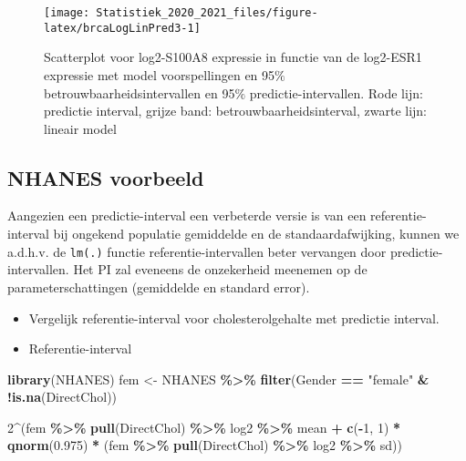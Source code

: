 \documentclass[
  12pt,dutch,coursenotes]{book}
\newenvironment{Shaded}{\begin{snugshade}}{\end{snugshade}}
\newcommand{\DecValTok}[1]{\textcolor[rgb]{0.00,0.00,0.81}{#1}}
\newcommand{\FloatTok}[1]{\textcolor[rgb]{0.00,0.00,0.81}{#1}}
\newcommand{\KeywordTok}[1]{\textcolor[rgb]{0.13,0.29,0.53}{\textbf{#1}}}
\newcommand{\NormalTok}[1]{#1}
\newcommand{\OperatorTok}[1]{\textcolor[rgb]{0.81,0.36,0.00}{\textbf{#1}}}
\newcommand{\StringTok}[1]{\textcolor[rgb]{0.31,0.60,0.02}{#1}}
\theoremstyle{definition}
\theoremstyle{definition}
\theoremstyle{definition}
\theoremstyle{remark}
\begin{document}
\begin{figure}

{\centering \texttt{[image: Statistiek\_2020\_2021\_files/figure-latex/brcaLogLinPred3-1]} 

}

\caption{Scatterplot voor log2-S100A8 expressie in functie van de log2-ESR1 expressie met model voorspellingen en 95$\%$ betrouwbaarheidsintervallen en 95$\%$ predictie-intervallen. Rode lijn: predictie interval, grijze band: betrouwbaarheidsinterval, zwarte lijn: lineair model}\label{fig:brcaLogLinPred3}
\end{figure}

\hypertarget{nhanes-voorbeeld}{%
\subsection{NHANES voorbeeld}\label{nhanes-voorbeeld}}

Aangezien een predictie-interval een verbeterde versie is van een referentie-interval bij ongekend populatie gemiddelde en de standaardafwijking, kunnen we a.d.h.v. de \texttt{lm(.)} functie referentie-intervallen beter vervangen door predictie-intervallen.
Het PI zal eveneens de onzekerheid meenemen op de parameterschattingen (gemiddelde en standard error).

\begin{itemize}
\item
  Vergelijk referentie-interval voor cholesterolgehalte met predictie interval.
\item
  Referentie-interval
\end{itemize}

\begin{Shaded}
\begin{Highlighting}[]
\KeywordTok{library}\NormalTok{(NHANES)}
\NormalTok{fem \textless{}{-}}\StringTok{ }\NormalTok{NHANES }\OperatorTok{\%\textgreater{}\%}\StringTok{ }\KeywordTok{filter}\NormalTok{(Gender }\OperatorTok{==}\StringTok{ "female"} \OperatorTok{\&}\StringTok{ }\OperatorTok{!}\KeywordTok{is.na}\NormalTok{(DirectChol))}

\DecValTok{2}\OperatorTok{\^{}}\NormalTok{(fem }\OperatorTok{\%\textgreater{}\%}\StringTok{ }\KeywordTok{pull}\NormalTok{(DirectChol) }\OperatorTok{\%\textgreater{}\%}\StringTok{ }\NormalTok{log2 }\OperatorTok{\%\textgreater{}\%}\StringTok{ }\NormalTok{mean }\OperatorTok{+}\StringTok{ }\KeywordTok{c}\NormalTok{(}\OperatorTok{{-}}\DecValTok{1}\NormalTok{, }
    \DecValTok{1}\NormalTok{) }\OperatorTok{*}\StringTok{ }\KeywordTok{qnorm}\NormalTok{(}\FloatTok{0.975}\NormalTok{) }\OperatorTok{*}\StringTok{ }\NormalTok{(fem }\OperatorTok{\%\textgreater{}\%}\StringTok{ }\KeywordTok{pull}\NormalTok{(DirectChol) }\OperatorTok{\%\textgreater{}\%}\StringTok{ }
\StringTok{    }\NormalTok{log2 }\OperatorTok{\%\textgreater{}\%}\StringTok{ }\NormalTok{sd))}
\end{Highlighting}
\end{Shaded}
\end{document}
